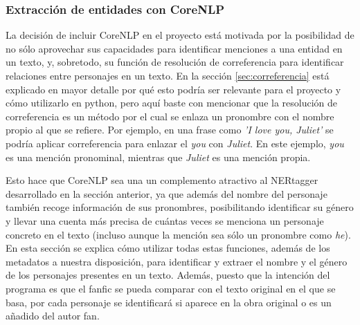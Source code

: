 \documentclass{pre-tfg}
\begin{document}

\subsubsection{Extracción de entidades con CoreNLP}
La decisión de incluir CoreNLP en el proyecto está motivada por la posibilidad de no sólo aprovechar sus capacidades para identificar menciones a una entidad en un texto, y, sobretodo, su función de resolución de correferencia para identificar relaciones entre personajes en un texto. En la sección \ref{sec:correferencia} está explicado en mayor detalle por qué esto podría ser relevante para el proyecto y cómo utilizarlo en python, pero aquí baste con mencionar que la resolución de correferencia es un método por el cual se enlaza un pronombre con el nombre propio al que se refiere. Por ejemplo, en una frase como \textit{'I love you, Juliet'} se podría aplicar correferencia para enlazar el \textit{you} con \textit{Juliet}. En este ejemplo, \textit{you} es una mención pronominal, mientras que \textit{Juliet} es una mención propia.

Esto hace que CoreNLP sea una un complemento atractivo al NERtagger desarrollado en la sección anterior, ya que además del nombre del personaje también recoge información de sus pronombres, posibilitando identificar su género y llevar una cuenta más precisa de cuántas veces se menciona un personaje concreto en el texto (incluso aunque la mención sea sólo un pronombre como \textit{he}). En esta sección se explica cómo utilizar todas estas funciones, además de los metadatos a nuestra disposición, para identificar y extraer el nombre y el género de los personajes presentes en un texto. Además, puesto que la intención del programa es que el fanfic se pueda comparar con el texto original en el que se basa, por cada personaje se identificará si aparece en la obra original o es un añadido del autor fan.
\end{document}
